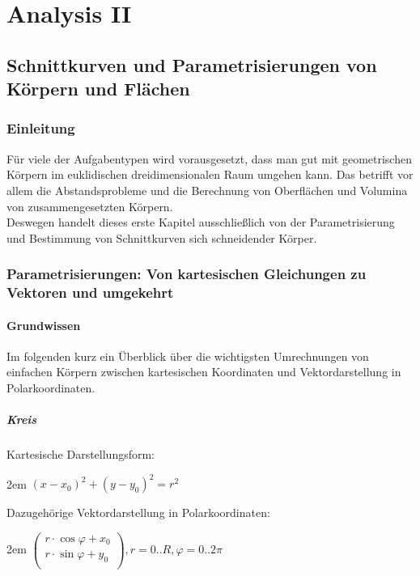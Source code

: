 \documentclass[11pt,final]{scrreprt}
\begin{document}
\part{Analysis II}

\chapter{Schnittkurven und Parametrisierungen von Körpern und Flächen}

\section{Einleitung}

Für viele der Aufgabentypen wird vorausgesetzt, dass man gut mit geometrischen Körpern im euklidischen dreidimensionalen Raum umgehen kann. Das betrifft vor allem die Abstandsprobleme und die Berechnung von Oberflächen und Volumina von zusammengesetzten Körpern.\\
Deswegen handelt dieses erste Kapitel ausschließlich von der Parametrisierung und Bestimmung von Schnittkurven sich schneidender Körper.

\section{Parametrisierungen: Von kartesischen Gleichungen zu Vektoren und umgekehrt}

\subsection{Grundwissen}

Im folgenden kurz ein Überblick über die wichtigsten Umrechnungen von einfachen Körpern zwischen kartesischen Koordinaten und Vektordarstellung in Polarkoordinaten.

\subsubsection{Kreis}

Kartesische Darstellungsform:

\begingroup
\leftskip2em 
$ (x-x_0)^2+(y-y_0)^2 = r^2 $\\
\par	
\endgroup

Dazugehörige Vektordarstellung in Polarkoordinaten:

\begingroup
\leftskip2em 
$ \left( \begin{matrix}
r\cdot\cos\varphi+x_0\\r\cdot\sin\varphi+y_0\\
\end{matrix} \right), r=0..R, \varphi=0..2\pi $
\par	
\endgroup
\end{document}
